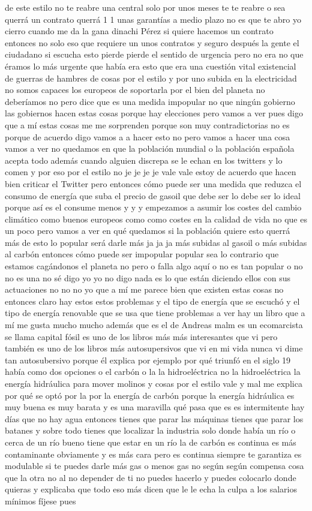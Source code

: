 de este estilo no te reabre una central solo por unos meses te te reabre o sea querrá un contrato querrá 1 1 unas garantías a medio plazo no es que te abro yo cierro cuando me da la gana dinachi Pérez si quiere hacemos un contrato entonces no solo eso que requiere un unos contratos y seguro después la gente el ciudadano si escucha esto pierde pierde el sentido de urgencia pero no era no que éramos lo más urgente que había era esto que era una cuestión vital existencial de guerras de hambres de cosas por el estilo y por uno subida en la electricidad no somos capaces los europeos de soportarla por el bien del planeta no deberíamos no pero dice que es una medida impopular no que ningún gobierno las gobiernos hacen estas cosas porque hay elecciones pero vamos a ver pues digo que a mí estas cosas me me sorprenden porque son muy contradictorias no es porque de acuerdo digo vamos a a hacer esto no pero vamos a hacer una cosa vamos a ver no quedamos en que la población mundial o la población española acepta todo además cuando alguien discrepa se le echan en los twitters y lo comen y por eso por el estilo no je je je je vale vale estoy de acuerdo que hacen bien criticar el Twitter pero entonces cómo puede ser una medida que reduzca el consumo de energía que suba el precio de gasoil que debe ser lo debe ser lo ideal porque así es el consume menos y y y empezamos a asumir los costes del cambio climático como buenos europeos como como costes en la calidad de vida no que es un poco pero vamos a ver en qué quedamos si la población quiere esto querrá más de esto lo popular será darle más ja ja ja más subidas al gasoil o más subidas al carbón entonces cómo puede ser impopular popular sea lo contrario que estamos cagándonos el planeta no pero o falla algo aquí o no es tan popular o no no es una no sé digo yo yo no digo nada es lo que están diciendo ellos con sus actuaciones no no no yo que a mí me parece bien que existen estas cosas no entonces claro hay estos estos problemas y el tipo de energía que se escuchó y el tipo de energía renovable que se usa que tiene problemas a ver hay un libro que a mí me gusta mucho mucho además que es el de Andreas malm es un ecomarcista se llama capital fósil es uno de los libros más más interesantes que vi pero también es uno de los libros más autosupersivos que vi en mi vida nunca vi dime tan autosubersivo porque él explica por ejemplo por qué triunfó en el siglo 19 había como dos opciones o el carbón o la la hidroeléctrica no la hidroeléctrica la energía hidráulica para mover molinos y cosas por el estilo vale y mal me explica por qué se optó por la por la energía de carbón porque la energía hidráulica es muy buena es muy barata y es una maravilla qué pasa que es es intermitente hay días que no hay agua entonces tienes que parar las máquinas tienes que parar los batanes y sobre todo tienes que localizar la industria solo donde había un río o cerca de un río bueno tiene que estar en un río la de carbón es continua es más contaminante obviamente y es más cara pero es continua siempre te garantiza es modulable si te puedes darle más gas o menos gas no según según compensa cosa que la otra no al no depender de ti no puedes hacerlo y puedes colocarlo donde quieras y explicaba que todo eso más dicen que le le echa la culpa a los salarios mínimos fíjese pues 